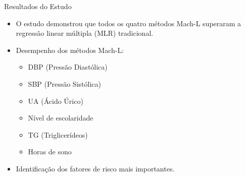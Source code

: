 \begin{frame}{Resultados do Estudo}
	\begin{itemize}
		\item O estudo demonstrou que todos os quatro métodos Mach-L superaram a regressão linear múltipla (MLR) tradicional.
		\item Desempenho dos métodos Mach-L:
		\begin{itemize}
			\item DBP (Pressão Diastólica)
			\item SBP (Pressão Sistólica)
			\item UA (Ácido Úrico)
			\item Nível de escolaridade
			\item TG (Triglicerídeos)
			\item Horas de sono
		\end{itemize}
		\item Identificação dos fatores de risco mais importantes.
	\end{itemize}
\end{frame}



